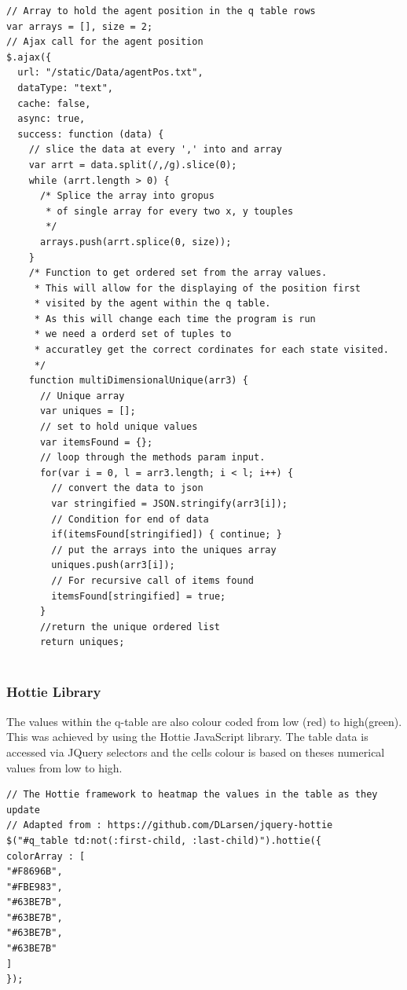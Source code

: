 \begin{verbatim}
// Array to hold the agent position in the q table rows
var arrays = [], size = 2;
// Ajax call for the agent position 
$.ajax({
  url: "/static/Data/agentPos.txt",
  dataType: "text",
  cache: false,
  async: true,
  success: function (data) {
    // slice the data at every ',' into and array 
    var arrt = data.split(/,/g).slice(0);
    while (arrt.length > 0) {
      /* Splice the array into gropus
       * of single array for every two x, y touples 
       */
      arrays.push(arrt.splice(0, size));
    }
    /* Function to get ordered set from the array values.
     * This will allow for the displaying of the position first
     * visited by the agent within the q table.
     * As this will change each time the program is run
     * we need a orderd set of tuples to
     * accuratley get the correct cordinates for each state visited.
     */
    function multiDimensionalUnique(arr3) {
      // Unique array
      var uniques = [];
      // set to hold unique values
      var itemsFound = {};
      // loop through the methods param input.
      for(var i = 0, l = arr3.length; i < l; i++) {
        // convert the data to json
        var stringified = JSON.stringify(arr3[i]);
        // Condition for end of data
        if(itemsFound[stringified]) { continue; }
        // put the arrays into the uniques array
        uniques.push(arr3[i]);
        // For recursive call of items found
        itemsFound[stringified] = true;
      }
      //return the unique ordered list 
      return uniques;


\end{verbatim}

\subsubsection{Hottie Library}
The values within the q-table are also colour coded from low (red) to high(green). This was achieved by using the Hottie JavaScript library. The table data is accessed via JQuery selectors and the cells colour is based on theses numerical values from low to high.
\begin{verbatim}
// The Hottie framework to heatmap the values in the table as they update
// Adapted from : https://github.com/DLarsen/jquery-hottie
$("#q_table td:not(:first-child, :last-child)").hottie({
colorArray : [
"#F8696B",
"#FBE983",
"#63BE7B",
"#63BE7B",
"#63BE7B",
"#63BE7B"
]
});
\end{verbatim}

